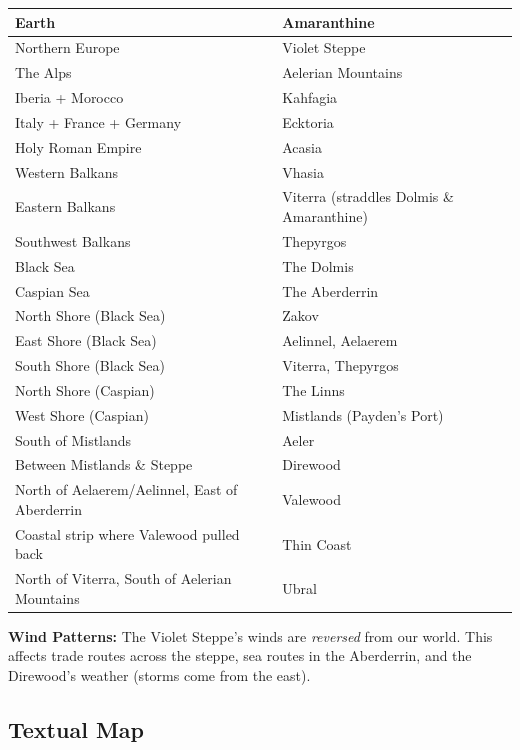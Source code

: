 \documentclass[12pt,oneside]{book}
\begin{document}
\begin{center}
\begin{tabular}{|l|l|}
\hline
\textbf{Earth} & \textbf{Amaranthine} \\
\hline
Northern Europe & Violet Steppe \\
The Alps & Aelerian Mountains \\
Iberia + Morocco & Kahfagia \\
Italy + France + Germany & Ecktoria \\
Holy Roman Empire & Acasia \\
Western Balkans & Vhasia \\
Eastern Balkans & Viterra (straddles Dolmis \& Amaranthine) \\
Southwest Balkans & Thepyrgos \\
Black Sea & The Dolmis \\
Caspian Sea & The Aberderrin \\
North Shore (Black Sea) & Zakov \\
East Shore (Black Sea) & Aelinnel, Aelaerem \\
South Shore (Black Sea) & Viterra, Thepyrgos \\
North Shore (Caspian) & The Linns \\
West Shore (Caspian) & Mistlands (Payden's Port) \\
South of Mistlands & Aeler \\
Between Mistlands \& Steppe & Direwood \\
North of Aelaerem/Aelinnel, East of Aberderrin & Valewood \\
Coastal strip where Valewood pulled back & Thin Coast \\
North of Viterra, South of Aelerian Mountains & Ubral \\
\hline
\end{tabular}
\end{center}

\textbf{Wind Patterns:} The Violet Steppe's winds are \emph{reversed} from our world. This affects trade routes across the steppe, sea routes in the Aberderrin, and the Direwood's weather (storms come from the east).

\subsection{Textual Map}
\end{document}
